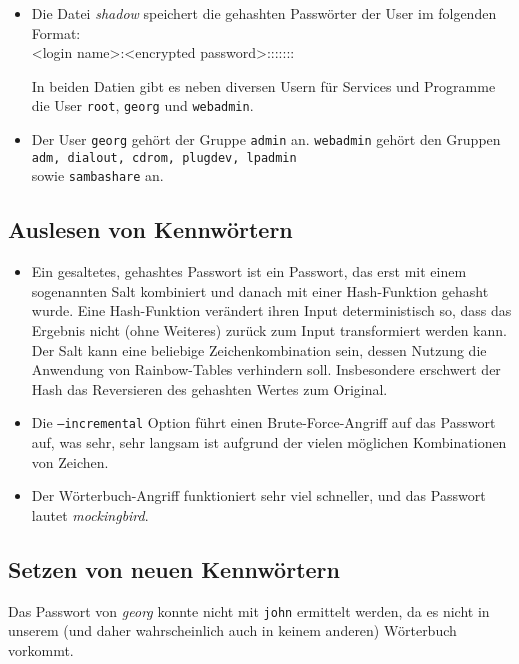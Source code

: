 \documentclass[12pt,a4paper]{article}
\begin{document}
\begin{itemize}
\begin{itemize}
\end{itemize}

\item Die Datei \textit{shadow} speichert die gehashten Passwörter der User im folgenden Format:\\
<login name>:<encrypted password>:::::::

In beiden Datien gibt es neben diversen Usern für Services und Programme die User \texttt{root}, \texttt{georg} und \texttt{webadmin}.

\item Der User \texttt{georg} gehört der Gruppe \texttt{admin} an. \texttt{webadmin} gehört den Gruppen \texttt{adm, dialout, cdrom, plugdev, lpadmin} \\  sowie \texttt{sambashare} an.
\end{itemize}

\subsection{Auslesen von Kennwörtern}
\begin{itemize}
\item Ein gesaltetes, gehashtes Passwort ist ein Passwort, das erst mit einem sogenannten Salt kombiniert und danach mit einer Hash-Funktion gehasht wurde. Eine Hash-Funktion verändert ihren Input deterministisch so, dass das Ergebnis nicht (ohne Weiteres) zurück zum Input transformiert werden kann. Der Salt kann eine beliebige Zeichenkombination sein, dessen Nutzung die Anwendung von Rainbow-Tables verhindern soll. Insbesondere erschwert der Hash das Reversieren des gehashten Wertes zum Original.
\item Die \texttt{---incremental} Option führt einen Brute-Force-Angriff auf das Passwort auf, was sehr, sehr langsam ist aufgrund der vielen möglichen Kombinationen von Zeichen.
\item Der Wörterbuch-Angriff funktioniert sehr viel schneller, und das Passwort lautet \textit{mockingbird}.
\end{itemize}

\subsection{Setzen von neuen Kennwörtern}
Das Passwort von \textit{georg} konnte nicht mit \texttt{john} ermittelt werden, da es nicht in unserem (und daher wahrscheinlich auch in keinem anderen) Wörterbuch vorkommt.
\end{document}
